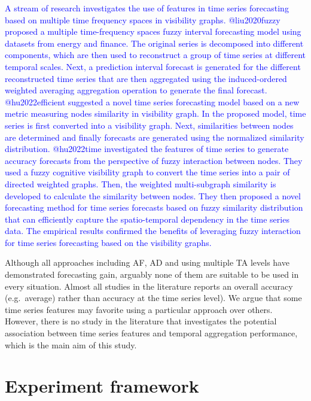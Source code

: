 \documentclass[preprint, 3p,
authoryear]{elsarticle} %
\begin{document}
\textcolor{blue}{A stream of research investigates the use of features in time series forecasting based on multiple time frequency spaces in visibility graphs. @liu2020fuzzy proposed a multiple time-frequency spaces fuzzy interval forecasting model using datasets from energy and finance. The original series is decomposed into different components, which are then used to reconstruct a group of time series at different temporal scales. Next, a prediction interval forecast is generated for the different reconstructed time series that are then aggregated using the induced-ordered weighted averaging aggregation operation to generate the final forecast. @hu2022efficient suggested a novel time series forecasting model based on a new metric measuring nodes similarity in visibility graph. In the proposed model, time series is first converted into a visibility graph. Next, similarities between nodes are determined and finally forecasts are generated using the normalized similarity distribution. @hu2022time investigated the features of time series to generate accuracy forecasts from the perspective of fuzzy interaction between nodes. They used a fuzzy cognitive visibility graph to convert the time series into a pair of directed weighted graphs. Then, the weighted multi-subgraph similarity is developed to calculate the similarity between nodes. They then proposed a novel forecasting method for time series forecasts based on fuzzy similarity distribution that can efficiently capture the spatio-temporal dependency in the time series data. The empirical results confirmed the benefits of leveraging fuzzy interaction for time series forecasting based on the visibility graphs.}

Although all approaches including AF, AD and using multiple TA levels
have demonstrated forecasting gain, arguably none of them are suitable
to be used in every situation. Almost all studies in the literature
reports an overall accuracy (e.g.~average) rather than accuracy at the
time series level). We argue that some time series features may favorite
using a particular approach over others. However, there is no study in
the literature that investigates the potential association between time
series features and temporal aggregation performance, which is the main
aim of this study.

\hypertarget{framework}{%
\section{Experiment framework}\label{framework}}
\end{document}
